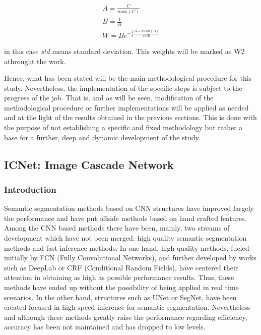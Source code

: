 \begin{eqnarray*}
A = \frac{C}{max(C)}\\
B = \frac{1}{B}\\
W = B e^{-\frac{1}{4}\frac{B-mean(B)}{std{B}}} 
\end{eqnarray*}

in this case \textit{std} means standard deviation. This weights will be marked as W2 athrought the work.\newline

Hence, what has been stated will be the main methodological procedure for this study. Nevertheless, the implementation of the specific steps is subject to the progress of the job. That is, and as will be seen, modification of the methodological procedure or further implementations will be applied as needed and at the light of the results obtained in the previous sections. This is done with the purpose of not establishing a specific and fixed methodology but rather a base for a further, deep and dynamic development of the study. \newline

\subsection{ICNet: Image Cascade Network}

\subsubsection{Introduction}

Semantic segmentation methods based on CNN structures have improved largely the performance and have put offside methods based on hand crafted features. Among the CNN based methods there have been, mainly, two streams of development which have not been merged: high quality semantic segmentation methods and fast inference methods. In one hand, high quality methods, fueled initially by FCN (Fully Convolutional Networks), and further developed by works such as DeepLab or CRF (Conditional Random Fields), have centered their attention in obtaining as high as possible performance results. Thus, these methods have ended up without the possibility of being applied in real time scenarios. In the other hand, structures such as UNet or SegNet, have been created focused in high speed inference for semantic segmentation. Nevertheless and although these methods greatly raise the performance regarding efficiency, accuracy has been not maintained and has dropped to low levels. \newline

